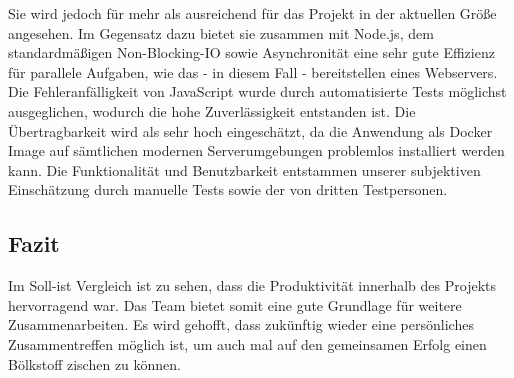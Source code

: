 Sie wird jedoch für mehr als ausreichend für das Projekt in der aktuellen Größe angesehen.
Im Gegensatz dazu bietet sie zusammen mit Node.js, dem standardmäßigen Non-Blocking-IO sowie
Asynchronität eine sehr gute Effizienz für parallele Aufgaben, wie das - in diesem Fall - bereitstellen eines Webservers.
Die Fehleranfälligkeit von JavaScript wurde durch automatisierte Tests möglichst ausgeglichen, wodurch die hohe Zuverlässigkeit
entstanden ist.
Die Übertragbarkeit wird als sehr hoch eingeschätzt, da die Anwendung als Docker Image auf sämtlichen modernen
Serverumgebungen problemlos installiert werden kann.
Die Funktionalität und Benutzbarkeit entstammen unserer subjektiven Einschätzung durch manuelle Tests sowie der von
dritten Testpersonen.
\\



\subsection{Fazit}\label{subsec:fazit}
Im Soll-ist Vergleich ist zu sehen, dass die Produktivität innerhalb des Projekts hervorragend war. Das Team bietet somit eine
gute Grundlage für weitere Zusammenarbeiten. Es wird gehofft, dass zukünftig wieder eine persönliches Zusammentreffen möglich ist,
um auch mal auf den gemeinsamen Erfolg einen Bölkstoff zischen zu können.